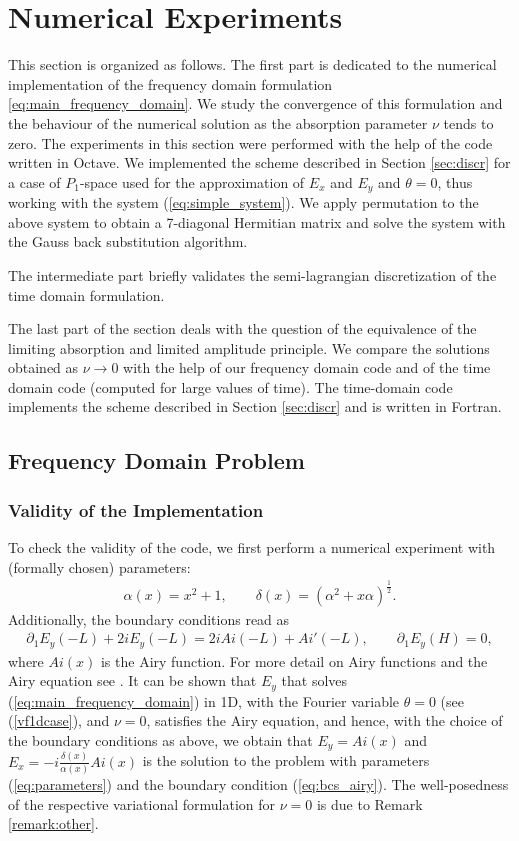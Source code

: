 
\section{Numerical Experiments}
This section is organized as follows. The first part is dedicated to the numerical implementation
of the frequency domain formulation \eqref{eq:main_frequency_domain}. We study the convergence of this formulation and the behaviour 
of the numerical solution as the absorption parameter $\nu$ tends to zero. The experiments in this section were 
performed with the help of the code written in Octave.  
We implemented the scheme described in Section \ref{sec:discr} for a case of $P_{1}$-space used 
for the approximation of $E_{x}$ and $E_{y}$ and $\theta=0$, thus working with the system (\ref{eq:simple_system}). 
We apply permutation to the above system 
to obtain a 7-diagonal Hermitian matrix and solve the system with the Gauss back substitution algorithm. 

The intermediate part briefly validates the semi-lagrangian discretization of the time domain formulation.

The last part of the section deals with the question of the equivalence of the limiting absorption and limited amplitude 
principle. We compare the solutions obtained as $\nu\rightarrow 0$ with the help of our frequency domain code 
and of the time domain code (computed for large values of time). 
The time-domain code implements the scheme described in Section \ref{sec:discr} and 
is written in Fortran.
 
\subsection{Frequency Domain Problem}
\label{sec:freq_dep}
\subsubsection{Validity of the Implementation}
To check the validity of the code, we first perform a numerical experiment with (formally chosen) parameters:
\begin{align}
\label{eq:parameters}
\alpha(x)=x^2+1,\qquad \delta(x)=\left(\alpha^2+x\alpha\right)^{\frac{1}{2}}.
\end{align}
Additionally, the boundary conditions read as 
\begin{align}
\label{eq:bcs_airy}
\partial_{1}E_{y}(-L)+2iE_{y}(-L)=2iAi(-L)+Ai'(-L),\qquad 
\partial_{1}E_{y}(H)=0,
\end{align}
where $Ai(x)$ is the Airy function. 
For more detail on Airy functions and the Airy equation see \cite[Chapter 10.4]{abramowitz_stegun}. 
It can be shown that $E_{y}$ that solves (\ref{eq:main_frequency_domain}) in 1D, with the Fourier variable $\theta=0$ (see (\ref{vf1dcase}), and $\nu=0$, 
satisfies the Airy equation, and hence, 
with the choice of the boundary conditions as above, we obtain that 
$
E_{y}=Ai(x)  $  and   %
$E_{x}=-i\frac{\delta(x)}{\alpha(x)}Ai(x)$
is the solution to the problem with parameters (\ref{eq:parameters}) and the boundary condition (\ref{eq:bcs_airy}). 
The well-posedness of the respective variational formulation for $\nu=0$ is due to Remark \ref{remark:other}. 

